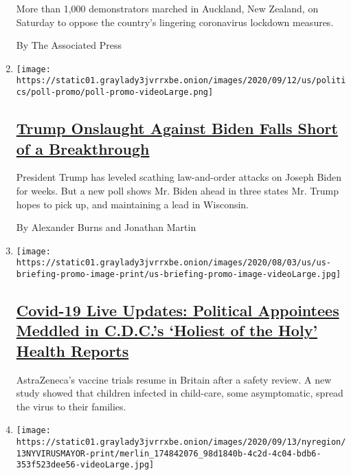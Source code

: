 \begin{enumerate}
  More than 1,000 demonstrators marched in Auckland, New Zealand, on
  Saturday to oppose the country's lingering coronavirus lockdown
  measures.

  By The Associated Press
\item
  \texttt{[image: https://static01.graylady3jvrrxbe.onion/images/2020/09/12/us/politics/poll-promo/poll-promo-videoLarge.png]}

  \hypertarget{trump-onslaught-against-biden-falls-short-of-a-breakthrough}{%
  \subsection{\texorpdfstring{\href{/2020/09/12/us/politics/biden-trump-poll-wisconsin-minnesota.html}{Trump
  Onslaught Against Biden Falls Short of a
  Breakthrough}}{Trump Onslaught Against Biden Falls Short of a Breakthrough}}\label{trump-onslaught-against-biden-falls-short-of-a-breakthrough}}

  President Trump has leveled scathing law-and-order attacks on Joseph
  Biden for weeks. But a new poll shows Mr. Biden ahead in three states
  Mr. Trump hopes to pick up, and maintaining a lead in Wisconsin.

  By Alexander Burns and Jonathan Martin
\item
  \texttt{[image: https://static01.graylady3jvrrxbe.onion/images/2020/08/03/us/us-briefing-promo-image-print/us-briefing-promo-image-videoLarge.jpg]}

  \hypertarget{covid-19-live-updates-political-appointees-meddled-in-cdcs-holiest-of-the-holy-health-reports}{%
  \subsection{\texorpdfstring{\href{/2020/09/12/world/covid-19-coronavirus.html}{Covid-19
  Live Updates: Political Appointees Meddled in C.D.C.'s `Holiest of the
  Holy' Health
  Reports}}{Covid-19 Live Updates: Political Appointees Meddled in C.D.C.'s `Holiest of the Holy' Health Reports}}\label{covid-19-live-updates-political-appointees-meddled-in-cdcs-holiest-of-the-holy-health-reports}}

  AstraZeneca's vaccine trials resume in Britain after a safety review.
  A new study showed that children infected in child-care, some
  asymptomatic, spread the virus to their families.
\item
  \texttt{[image: https://static01.graylady3jvrrxbe.onion/images/2020/09/13/nyregion/13NYVIRUSMAYOR-print/merlin\_174842076\_98d1840b-4c2d-4c04-bdb6-353f523dee56-videoLarge.jpg]}


\end{enumerate}
